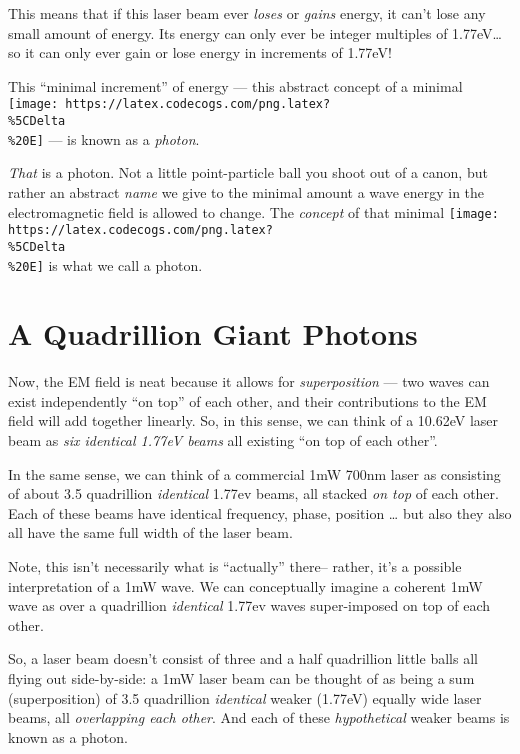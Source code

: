 \documentclass[]{article}
\begin{document}
This means that if this laser beam ever \emph{loses} or \emph{gains} energy, it
can't lose any small amount of energy. Its energy can only ever be integer
multiples of 1.77eV\ldots so it can only ever gain or lose energy in increments
of 1.77eV!

This ``minimal increment'' of energy --- this abstract concept of a minimal
\texttt{[image: https://latex.codecogs.com/png.latex?\\\%5CDelta\\\%20E]} --- is
known as a \emph{photon}.

\emph{That} is a photon. Not a little point-particle ball you shoot out of a
canon, but rather an abstract \emph{name} we give to the minimal amount a wave
energy in the electromagnetic field is allowed to change. The \emph{concept} of
that minimal
\texttt{[image: https://latex.codecogs.com/png.latex?\\\%5CDelta\\\%20E]} is what we
call a photon.

\hypertarget{a-quadrillion-giant-photons}{%
\section{A Quadrillion Giant Photons}\label{a-quadrillion-giant-photons}}

Now, the EM field is neat because it allows for \emph{superposition} --- two
waves can exist independently ``on top'' of each other, and their contributions
to the EM field will add together linearly. So, in this sense, we can think of a
10.62eV laser beam as \emph{six identical 1.77eV beams} all existing ``on top of
each other''.

In the same sense, we can think of a commercial 1mW 700nm laser as consisting of
about 3.5 quadrillion \emph{identical} 1.77ev beams, all stacked \emph{on top}
of each other. Each of these beams have identical frequency, phase, position
\ldots{} but also they also all have the same full width of the laser beam.

Note, this isn't necessarily what is ``actually'' there-- rather, it's a
possible interpretation of a 1mW wave. We can conceptually imagine a coherent
1mW wave as over a quadrillion \emph{identical} 1.77ev waves super-imposed on
top of each other.

So, a laser beam doesn't consist of three and a half quadrillion little balls
all flying out side-by-side: a 1mW laser beam can be thought of as being a sum
(superposition) of 3.5 quadrillion \emph{identical} weaker (1.77eV) equally wide
laser beams, all \emph{overlapping each other}. And each of these
\emph{hypothetical} weaker beams is known as a photon.
\end{document}
